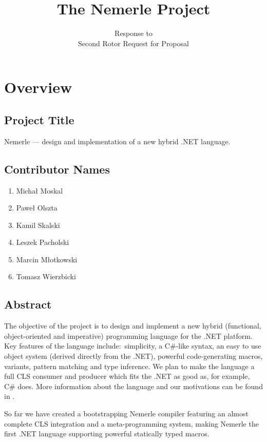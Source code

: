 \documentclass[a4paper,11pt]{article}
\title{The Nemerle Project}
\author{Response to\\Second Rotor Request for Proposal}
\date{}
\begin{document}
\maketitle
\thispagestyle{empty}

\section{Overview}

\subsection{Project Title}

Nemerle --- design and implementation of a new hybrid .NET language.

\subsection{Contributor Names}
\begin{enumerate}\itemsep0pt
\item Micha{\l} Moskal
\item Pawe{\l} Olszta
\item Kamil Skalski
\item Leszek Pacholski
\item Marcin M{\l}otkowski
\item Tomasz Wierzbicki
\end{enumerate}

\subsection{Abstract}

The objective of the project is to design and implement a new 
hybrid (functional, object-oriented and imperative) programming 
language for the .NET platform. Key features of the language 
include:~simplicity, a C\#-like syntax, an easy to use object 
system (derived directly from the .NET), powerful code-generating 
macros, variants, pattern matching and type inference. We plan 
to make the language a full CLS consumer and producer which 
fits the .NET as good as, for example, C\# does. More information
about the language and our motivations can be found in \cite{Intro}.

So far we have created a bootstrapping Nemerle compiler featuring
an almost complete CLS integration and a meta-programming system,
making Nemerle the first .NET language supporting powerful 
statically typed macros.
\end{document}
